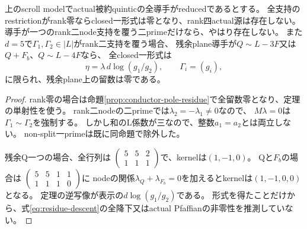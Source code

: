 \begin{corollary}[奇数導手の排除と残る一つの形式]\label{cor:scroll-conductor-residues}
上のscroll modelでactual被約quinticの全導手がreducedであるとする。
全支持のrestrictionがrank零ならclosed一形式は零となり、rank四actual源は存在しない。
導手が一つのrank二node支持を覆う二primeだけなら、やはり存在しない。
また$d=5$で$\Gamma_1,\Gamma_2\in|L|$がrank二支持を覆う場合、
残余plane導手が$Q\sim L-3F$又は$Q+F_b$、$Q\sim L-4F$なら、
全closed一形式は
\[
 \eta=\lambda\,d\log(g_1/g_2),\qquad\Gamma_i=(g_i),
\]
に限られ、残余plane上の留数は零である。
\end{corollary}
\begin{proof}
rank零の場合は命題\ref{prop:conductor-pole-residue}で全留数零となり、定理の単射性を使う。
rank二nodeの二primeでは$\lambda_2=-\lambda_1\ne0$なので、
$M\lambda=0$は$\Gamma_1\sim\Gamma_2$を強制する。
しかし和のL係数が三なので、整数$a_1=a_2$とは両立しない。
non-split一primeは既に同命題で除外した。

残余Q一つの場合、全行列は
$\left(\begin{smallmatrix}5&5&2\\1&1&1\end{smallmatrix}\right)$で、kernelは$(1,-1,0)$。
Qと$F_b$の場合は
$\left(\begin{smallmatrix}5&5&1&1\\1&1&1&0\end{smallmatrix}\right)$に
nodeの関係$\lambda_Q+\lambda_{F_b}=0$を加えるとkernelは$(1,-1,0,0)$となる。
定理の逆写像が表示の$d\log(g_1/g_2)$である。
形式を得たことだけから、式\eqref{eq:residue-descent}の全降下又はactual Pfaffianの非零性を推測していない。
\end{proof}

